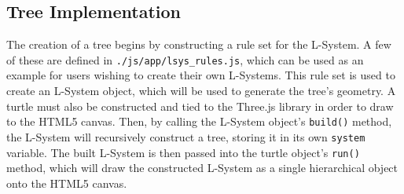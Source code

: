\documentclass{article}
\newcommand{\tab}{\hspace*{2em}}
\begin{document}
        \subsection{Tree Implementation}
    \tab The creation of a tree begins by constructing a rule set for the L-System. A few of these are
defined in \verb|./js/app/lsys_rules.js|, which can be used as an example for users wishing to
create their own L-Systems. This rule set is used to create an L-System object, which will be used
to generate the tree's geometry. A turtle must also be constructed and tied to the Three.js library
in order to draw to the HTML5 canvas. Then, by calling the L-System object's
\verb|build()| method, the L-System will recursively construct a tree, storing it in its own
\verb|system| variable. The built L-System is then passed into the turtle object's \verb|run()| method,
which will draw the constructed L-System as a single hierarchical object onto the HTML5 canvas.
\end{document}
